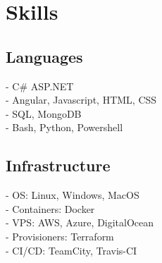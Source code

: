 \documentclass[]{Resume}
\begin{document}
\begin{minipage}[t]{0.33\textwidth}

\section{Skills}
\subsection{Languages}
- C\# ASP.NET \\
- Angular, Javascript, HTML, CSS \\
- SQL, MongoDB \\
- Bash, Python, Powershell
\sectionsep

\subsection{Infrastructure}
- OS: Linux, Windows, MacOS \\
- Containers: Docker \\
- VPS: AWS, Azure, DigitalOcean \\
- Provisioners: Terraform \\
- CI/CD: TeamCity, Travis-CI \\
\sectionsep


%
%

\end{minipage} 
\hfill
\end{document}
